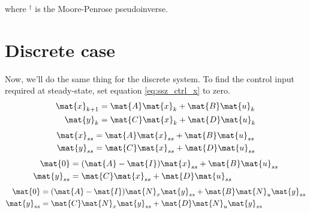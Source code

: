 where $^\dagger$ is the Moore-Penrose pseudoinverse.

\section{Discrete case}

Now, we'll do the same thing for the discrete \gls{system}. To find the
\gls{control input} required at steady-state, set equation \eqref{eq:ssz_ctrl_x}
to zero.
\begin{align*}
  \mat{x}_{k+1} &= \mat{A}\mat{x}_k + \mat{B}\mat{u}_k \\
  \mat{y}_k &= \mat{C}\mat{x}_k + \mat{D}\mat{u}_k
\end{align*}
\begin{align*}
  \mat{x}_{ss} &= \mat{A}\mat{x}_{ss} + \mat{B}\mat{u}_{ss} \\
  \mat{y}_{ss} &= \mat{C}\mat{x}_{ss} + \mat{D}\mat{u}_{ss}
\end{align*}
\begin{align*}
  \mat{0} &= (\mat{A} - \mat{I})\mat{x}_{ss} + \mat{B}\mat{u}_{ss} \\
  \mat{y}_{ss} &= \mat{C}\mat{x}_{ss} + \mat{D}\mat{u}_{ss}
\end{align*}
\begin{align*}
  \mat{0} &= (\mat{A} - \mat{I})\mat{N}_x\mat{y}_{ss} +
    \mat{B}\mat{N}_u\mat{y}_{ss} \\
  \mat{y}_{ss} &= \mat{C}\mat{N}_x\mat{y}_{ss} + \mat{D}\mat{N}_u\mat{y}_{ss}
\end{align*}
